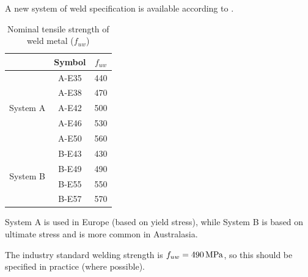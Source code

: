 A new system of weld specification is available according to \ASNZSWELD{}.
\begin{table}[H]
\centering\footnotesize
\caption{Nominal tensile strength of weld metal ($f_{uw}$)}
\begin{tabular}{ccc}
	\toprule
	                          &       Symbol        &           $f_{uw}$           \\ \midrule
	\multirow{5}{*}{System A} &        A-E35        &        \SI{440}{\mpa}        \\
	                          &        A-E38        &        \SI{470}{\mpa}        \\
	                          &        A-E42        &        \SI{500}{\mpa}        \\
	                          &        A-E46        &        \SI{530}{\mpa}        \\
	                          &        A-E50        &        \SI{560}{\mpa}        \\ \midrule
	\multirow{4}{*}{System B} &        B-E43        &        \SI{430}{\mpa}        \\
	                          & \color{cc0066}B-E49 & \color{cc0066}\SI{490}{\mpa} \\
	                          &        B-E55        &        \SI{550}{\mpa}        \\
	                          &        B-E57        &        \SI{570}{\mpa}        \\ \bottomrule
\end{tabular}
\end{table}
System A is used in Europe (based on yield stress), while System B is based on ultimate stress and is more common in Australasia.

The industry standard welding strength is $f_{uw}=\SI{490}{\mega\pascal}$, so this should be
specified in practice (where possible).
